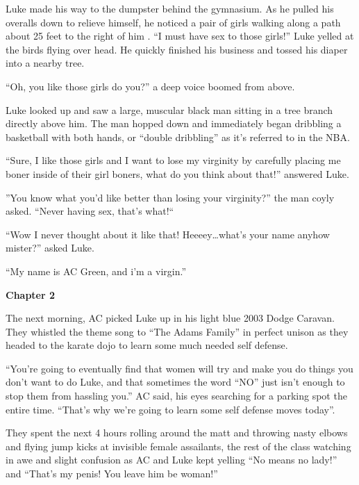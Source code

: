 Luke made his way to the dumpster behind the gymnasium. As he
pulled his overalls down to relieve himself, he noticed a pair of
girls walking along a path about 25 feet to the right of him . ``I
must have sex to those girls!'' Luke yelled at the birds flying over
head. He quickly finished his business and tossed his diaper into a
nearby tree.



``Oh, you like those girls do you?'' a deep voice boomed from
above.



Luke looked up and saw a large, muscular black man sitting in a
tree branch directly above him. The man hopped down and immediately
began dribbling a basketball with both hands, or ``double dribbling''
as it's referred to in the NBA.



``Sure, I like those girls and I want to lose my virginity by
carefully placing me boner inside of their girl boners, what do you
think about that!'' answered Luke.



''You know what you'd like better than losing your virginity?''
the man coyly asked. ``Never having sex, that's what!``



``Wow I never thought about it like that! Heeeey{\ldots}what's your
name anyhow mister?'' asked Luke.



``My name is AC Green, and i'm a virgin.''



{\bf Chapter 2}

The next morning, AC picked Luke up in his light blue 2003 Dodge
Caravan. They whistled the theme song to ``The Adams
Family'' in perfect unison as they headed to the karate dojo
to learn some much needed self defense.



``You're going to eventually find that women will try
and make you do things you don't want to do Luke, and that
sometimes the word ``NO'' just isn't enough to stop
them from hassling you.'' AC said, his eyes searching for a
parking spot the entire time. ``That's why we're
going to learn some self defense moves today''.



They spent the next 4 hours rolling around the matt and throwing
nasty elbows and flying jump kicks at invisible female assailants,
the rest of the class watching in awe and slight confusion as AC
and Luke kept yelling ``No means no lady!'' and
``That's my penis! You leave him be woman!''



